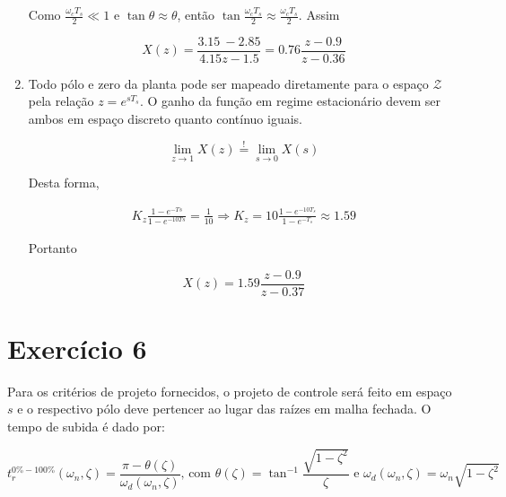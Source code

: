 \documentclass[twoside, fleqn]{article}
\begin{document}
\begin{enumerate}
        Como $\frac{\omega_c T_s}{2} \ll 1$ e $\tan{\theta} \approx \theta$, então $\tan{\frac{\omega_c T_s}{2}} \approx \frac{\omega_c T_s}{2}$. Assim
        
            \begin{equation}
                X(z) = \frac{3.15\ - 2.85}{4.15z - 1.5} = 0.76 \frac{z - 0.9}{z - 0.36}
            \end{equation}
        
        \item %
        
        Todo pólo e zero da planta pode ser mapeado diretamente para o espaço $\mathcal{Z}$ pela relação $z = e^{s T_s}$. O ganho da função em regime estacionário devem ser ambos em espaço discreto quanto contínuo iguais.
        
            \begin{equation}
                \lim\limits_{z \rightarrow 1} X(z) \stackrel{!}{=} \lim\limits_{s \rightarrow 0} X(s) 
            \end{equation}
        
        Desta forma,
        
            \begin{equation*}
                \begin{split}
                    K_z \frac{1 - e^{-Ts}}{1 - e^{-10Ts}} = \frac{1}{10} \Rightarrow K_z = 10 \frac{1 - e^{-10T_s}}{1 - e^{-T_s}} \approx 1.59
                \end{split}
            \end{equation*}
            
        Portanto
        
            \begin{equation}
                X(z) = 1.59 \frac{z - 0.9}{z - 0.37}
            \end{equation}
        
    \end{enumerate}

\section*{Exercício 6}

    Para os critérios de projeto fornecidos, o projeto de controle será feito em espaço $s$ e o respectivo pólo deve pertencer ao lugar das raízes em malha fechada. O tempo de subida é dado por:
    
        \begin{equation}
            t^{0\% - 100\%}_{r}(\omega_n, \zeta) = \frac{\pi - \theta(\zeta)}{\omega_d(\omega_n, \zeta)} \mbox{, com } \theta(\zeta) = \tan^{-1}\frac{\sqrt{1 - \zeta^2}}{\zeta} \mbox{ e } \omega_d(\omega_n, \zeta) = \omega_n \sqrt{1-\zeta^2}
            \label{eq:tempo_de_subida}
        \end{equation}
    
\end{document}

